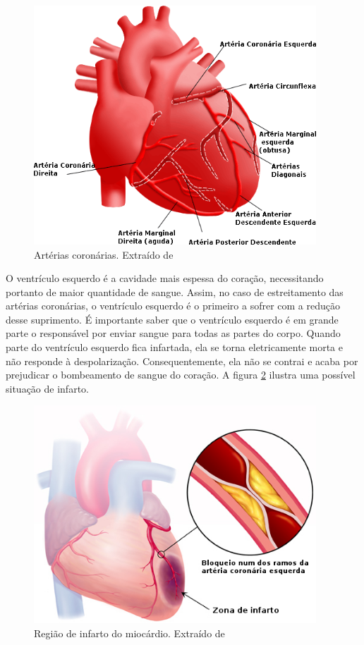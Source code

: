 \begin{figure}[ht!]
 \centering
 \includegraphics[width=300pt]{figures/chap2-arteries.png}
 \caption[Artérias coronárias]{Artérias coronárias. Extraído de \cite{yale}}
 \label{fig:arteries}
\end{figure}

O ventrículo esquerdo é a cavidade mais espessa do coração, necessitando portanto de maior quantidade de sangue. Assim, no caso de estreitamento das artérias coronárias, o ventrículo esquerdo é o primeiro a sofrer com a redução desse suprimento. É importante saber que o ventrículo esquerdo é em grande parte o responsável por enviar sangue para todas as partes do corpo. Quando parte do ventrículo esquerdo fica infartada, ela se torna eletricamente morta e não responde à despolarização. Consequentemente, ela não se contrai e acaba por prejudicar o bombeamento de sangue do coração. A figura \ref{fig:infarction} ilustra uma possível situação de infarto.

\begin{figure}[ht!]
 \centering
 \includegraphics[width=300pt]{figures/chap2-infarction.jpg}
 \caption[Infarto do miocárdio]{Região de infarto do miocárdio. Extraído de \cite{Antipuesto2014}}
 \label{fig:infarction}
\end{figure}

